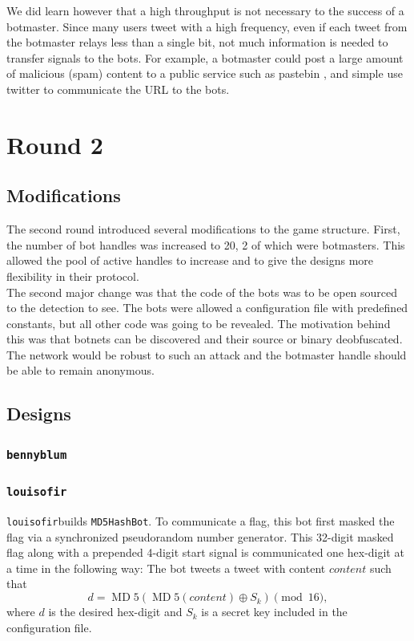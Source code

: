 \documentclass[11pt, oneside]{article} %
\numberwithin{equation}{section} %
\numberwithin{figure}{section} %
\numberwithin{table}{section} %
\renewcommand{\c}[1]{\texttt{#1}}
\newcommand{\teambb}{\c{bennyblum}}
\newcommand{\teamol}{\c{louisofir}}
\DeclareMathOperator{\MD}{MD}
\begin{document}
		We did learn however that a high throughput is not necessary to the success of a botmaster. Since many users tweet with a high frequency, even if each tweet from the botmaster relays less than a single bit, not much information is needed to transfer signals to the bots. For example, a botmaster could post a large amount of malicious (spam) content to a public service such as pastebin \cite{pastebin} , and simple use twitter to communicate the URL to the bots. \\


\section{Round 2}
	\subsection{Modifications}
		The second round introduced several modifications to the game structure. First, the number of bot handles was increased to 20, 2 of which were botmasters. This allowed the pool of active handles to increase and to give the designs more flexibility in their protocol. \\

		The second major change was that the code of the bots was to be open sourced to the detection to see. The bots were allowed a configuration file with predefined constants, but all other code was going to be revealed. The motivation behind this was that botnets can be discovered and their source or binary deobfuscated. The network would be robust to such an attack and the botmaster handle should be able to remain anonymous. \\

		
	\subsection{Designs}
		\subsubsection{\teambb}
		\subsubsection{\teamol}
			\teamol builds \c{MD5HashBot}.  To communicate a flag, this bot first masked the flag via a synchronized pseudorandom number generator.  This 32-digit masked flag along with a prepended 4-digit start signal is communicated one hex-digit at a time in the following way: The bot tweets a tweet with content $content$ such that
			\[
				d=\MD5(\MD5(content)\oplus S_k) \pmod{16},
			\] 
			where $d$ is the desired hex-digit and $S_k$ is a secret key included in the configuration file.
\end{document}
